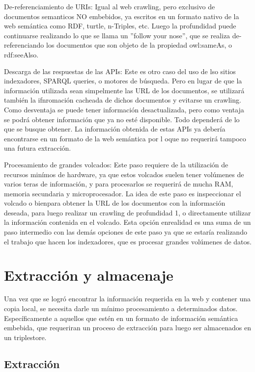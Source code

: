 De-referenciamiento de URIs: Igual al web crawling, pero exclusivo de documentos semanticos NO embebidos, ya escritos en un formato nativo de la web semántica como RDF, turtle, n-Triples, etc.
Luego la profundidad puede continuarse realizando lo que se llama un ''follow your nose'', que se realiza de-referenciando los documentos que son objeto de la propiedad owl:sameAs, o rdf:seeAlso.

Descarga de las respuestas de las APIs: Este es otro caso del uso de lso sitios indexadores, SPARQL queries, o motores de búsqueda. Pero en lugar de 
que la información  utilizada sean simpelmente las URL de los documentos, se utilizará también la ifnromación cacheada de dichos documentos y evitarse un crawling.
Como desventaja se puede tener información desactualizada, pero como ventaja se podrá obtener información que ya no esté disponible. Todo dependerá de lo que se busque obtener.
La información obtenida de estas APIs ya debería encontrarse en un formato de la web semántica por l oque no requerirá tampoco una futura extracción.

Procesamiento de grandes volcados: Este paso requiere de la utilización de recursos minímos de hardware, ya que estos volcados suelen tener volúmenes de varios teras de información, y para procesarlos se requerirá 
de mucha RAM, memoria secundaria y microprocesador.
La idea de este paso es inspeccionar el volcado o bienpara obtener la URL de los documentos con la información deseada, para luego realizar un crawling de profundidad 1, 
o directamente utilizar la información contenida en el volcado.
Esta opción enrealidad es una suma de un paso intermedio con las demás opciones de este paso ya que se estaría realizando el trabajo que hacen los indexadores, que es procesar grandes volúmenes de datos.

\section{Extracción y almacenaje}

Una vez que se logró encontrar la información requerida en la web y contener una copia local, se necesita darle un mínimo procesamiento a determinados datos.
Específicamente a aquellos que estén en un formato de información semántica embebida, que requeriran un proceso de extracción para luego ser almacenados en un triplestore.


\subsection{Extracción}

